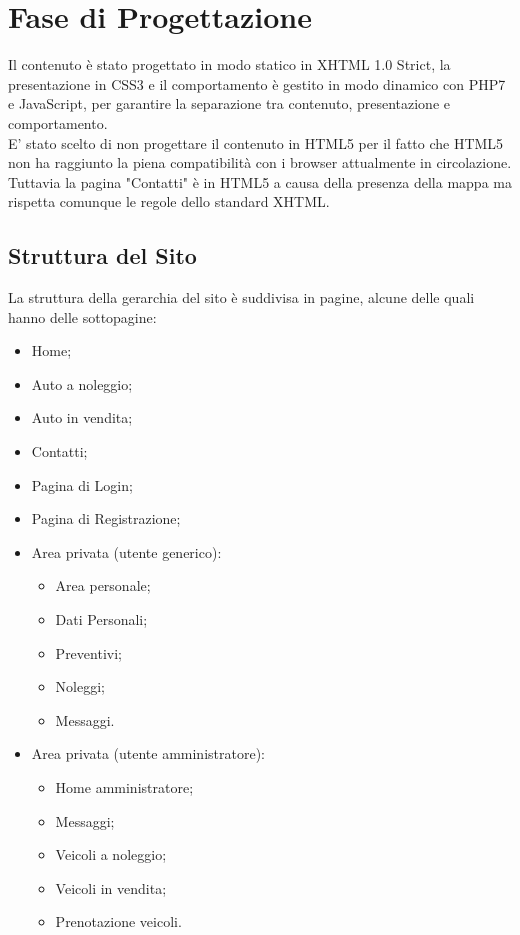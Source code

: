 \section{Fase di Progettazione}
    Il contenuto è stato progettato in modo statico in XHTML 1.0 Strict, la presentazione in CSS3 e il comportamento è gestito in modo dinamico con PHP7 e JavaScript, per garantire la separazione tra contenuto, presentazione e comportamento. \\
    E’ stato scelto di non progettare il contenuto in HTML5 per il fatto che HTML5 non ha raggiunto la piena compatibilità con i browser attualmente in circolazione. Tuttavia la pagina "Contatti" è in HTML5 a causa della presenza della mappa ma rispetta comunque le regole dello standard XHTML.

    \subsection{Struttura del Sito}
    La struttura della gerarchia del sito è suddivisa in pagine, alcune delle quali hanno delle sottopagine:
    \begin{itemize}
        \item Home;
        \item Auto a noleggio;
        \item Auto in vendita;
        \item Contatti;
        \item Pagina di Login;
        \item Pagina di Registrazione;
        \item Area privata (utente generico):
            \begin{itemize}
                \item Area personale;
                \item Dati Personali;
                \item Preventivi;
                \item Noleggi;
                \item Messaggi.
            \end{itemize}
        \item Area privata (utente amministratore):
            \begin{itemize}
            	\item Home amministratore;
                 \item Messaggi;
                 \item Veicoli a noleggio;
                 \item Veicoli in vendita;
                 \item Prenotazione veicoli.
            \end{itemize}
    \end{itemize}

